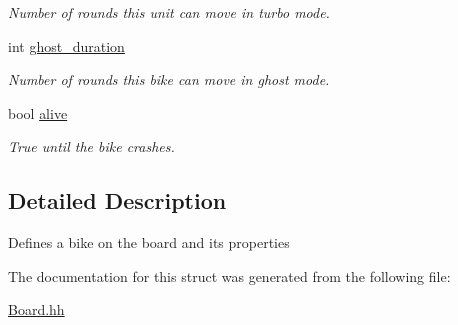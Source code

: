 \begin{DoxyCompactItemize}
\begin{DoxyCompactList}\small\item\em Number of rounds this unit can move in turbo mode. \end{DoxyCompactList}\item 
int \hyperlink{structBike_a79f5485daec877c4a14a78ab1d1ef261}{ghost\+\_\+duration}\hypertarget{structBike_a79f5485daec877c4a14a78ab1d1ef261}{}\label{structBike_a79f5485daec877c4a14a78ab1d1ef261}

\begin{DoxyCompactList}\small\item\em Number of rounds this bike can move in ghost mode. \end{DoxyCompactList}\item 
bool \hyperlink{structBike_a856ccfba4773cb502f20543988c3be28}{alive}\hypertarget{structBike_a856ccfba4773cb502f20543988c3be28}{}\label{structBike_a856ccfba4773cb502f20543988c3be28}

\begin{DoxyCompactList}\small\item\em True until the bike crashes. \end{DoxyCompactList}\end{DoxyCompactItemize}


\subsection{Detailed Description}
Defines a bike on the board and its properties 

The documentation for this struct was generated from the following file\+:\begin{DoxyCompactItemize}
\item 
\hyperlink{Board_8hh}{Board.\+hh}\end{DoxyCompactItemize}

